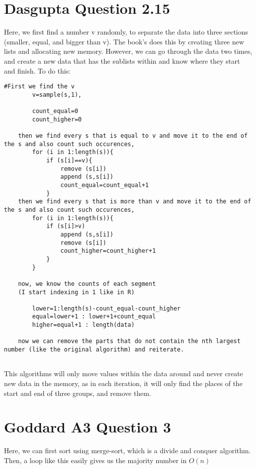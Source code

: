     \section{Dasgupta Question 2.15}\label{sec:question-2.15}
    Here, we first find a number v randomly, to separate the data into three sections (smaller, equal, and bigger
    than v). The book's does this by creating three new lists and allocating new memory. However, we can go through
    the data two times, and create a new data that has the sublists within and know where they start and finish. To do
    this:
    \begin{lstlisting}[label={lst:median}]
        #First we find the v
        v=sample(s,1),

        count_equal=0
        count_higher=0

    then we find every s that is equal to v and move it to the end of the s and also count such occurences,
        for (i in 1:length(s)){
            if (s[i]==v){
                remove (s[i])
                append (s,s[i])
                count_equal=count_equal+1
            }
    then we find every s that is more than v and move it to the end of the s and also count such occurences,
        for (i in 1:length(s)){
            if (s[i]>v)
                append (s,s[i])
                remove (s[i])
                count_higher=count_higher+1
            }
        }

    now, we know the counts of each segment
    (I start indexing in 1 like in R)

        lower=1:length(s)-count_equal-count_higher
        equal=lower+1 : lower+1+count_equal
        higher=equal+1 : length(data)

    now we can remove the parts that do not contain the nth largest number (like the original algorithm) and reiterate.


    \end{lstlisting}

    This algorithms will only move values within the data around and never create new data in the memory, as in each
    iteration, it will only find the places of the start and end of three groups, and remove them.

    \newpage


    \section{Goddard A3 Question 3}\label{sec:goddard}

    Here, we can first sort using merge-sort, which is a divide and conquer algorithm.
    Then, a loop like this easily gives us the majority number in $O(n)$

